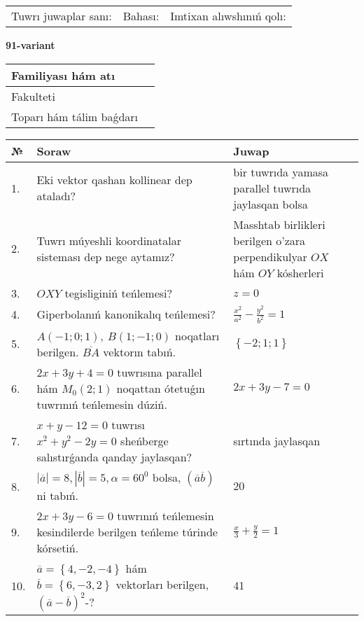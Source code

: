 \documentclass{article}
\begin{document}
\vspace{1cm}

\begin{tabular}{lll}
Tuwrı juwaplar sanı: \underline{\hspace{1.5cm}} & 
Bahası: \underline{\hspace{1.5cm}} & 
Imtixan alıwshınıń qolı: \underline{\hspace{2cm}} \\
\end{tabular}

\egroup

\newpage


\textbf{91-variant}\\

\bgroup
\def\arraystretch{1.6} %

\begin{tabular}{|m{5.7cm}|m{9.5cm}|}
\hline
Familiyası hám atı & \\
\hline
Fakulteti  & \\
\hline
Toparı hám tálim baǵdarı  & \\
\hline
\end{tabular}

\vspace{1cm}

\begin{tabular}{|m{0.7cm}|m{10cm}|m{4cm}|}
\hline
№ & Soraw & Juwap \\
\hline
1. & Eki vektor qashan kollinear dep ataladı? & bir tuwrıda yamasa parallel tuwrıda jaylasqan bolsa \\
\hline
2. & Tuwrı múyeshli koordinatalar sisteması dep nege aytamız? & Masshtab birlikleri berilgen o'zara perpendikulyar $OX$ hám $OY$ kósherleri \\
\hline
3. & $OXY$ tegisliginiń teńlemesi? & $z=0$ \\
\hline
4. & Giperbolanıń kanonikalıq teńlemesi? & $\frac{x^2}{a^2}-\frac{y^2}{b^2}=1$ \\
\hline
5. & $A (-1;0;1),\ B (1;-1;0)$ noqatları berilgen. $\overline{BA}$ vektorın tabıń. & $\left\{ - 2;1;1 \right\}$ \\
\hline
6. & $2x+3y+4=0$ tuwrısına parallel hám $M_{0} (2;1)$ noqattan ótetuǵın tuwrınıń teńlemesin dúziń. & $2x+3y-7=0$ \\
\hline
7. & $x+y-12=0$ tuwrısı $x^{2}+y^{2}-2y=0$ sheńberge salıstırǵanda qanday jaylasqan? & sırtında jaylasqan \\
\hline
8. & $\left| \overline{a} \right|=8, \left| \overline{b} \right|=5, \alpha=60^{0}$ bolsa, $( \overline{a}\overline{b} )$ ni tabıń. & $20$ \\
\hline
9. & $2x+3y-6=0$ tuwrınıń teńlemesin kesindilerde berilgen teńleme túrinde kórsetiń. & $\frac{x}{3} + \frac{ y }{ 2 } =  1$ \\
\hline
10. & $\overline{a}=\left\{ 4,-2,-4 \right\}$ hám $\overline{b}=\left\{ 6,-3, 2 \right\}$ vektorları berilgen, $(\overline{a}-\overline{b}) ^{2}$-? & $41$ \\
\hline
\end{tabular}
\end{document}
